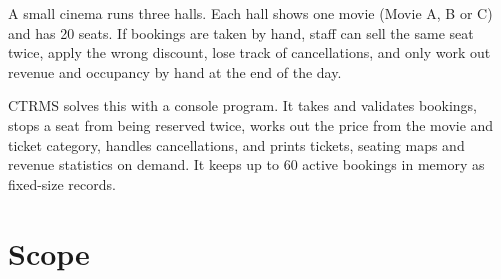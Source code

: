 \documentclass{thesis-library}
\begin{document}
A small cinema runs three halls. Each hall shows one movie (Movie A, B or C) and has 20 seats.
If bookings are taken by hand, staff can sell the same seat twice, apply the wrong discount,
lose track of cancellations, and only work out revenue and occupancy by hand at the end of the day.

CTRMS solves this with a console program. It takes and validates bookings, stops a seat from
being reserved twice, works out the price from the movie and ticket category, handles
cancellations, and prints tickets, seating maps and revenue statistics on demand. It keeps up to
60 active bookings in memory as fixed-size records.

\section{Scope}
\end{document}
